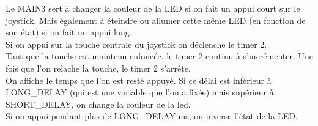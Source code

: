 Le MAIN3 sert à changer la couleur de la LED si on fait un appui court sur le joystick. Mais également à éteindre ou allumer cette même LED (en fonction de son état) si on fait un appui long.\\

Si on appui sur la touche centrale du joystick on déclenche le timer 2.\\
Tant que la touche est maintenu enfoncée, le timer 2 continu à s'incrémenter.
Une fois que l'on relache la touche, le timer 2 s'arrête.\\
On affiche le temps que l'on est resté appuyé.
Si ce délai est inférieur à LONG\_DELAY (qui est une variable que l'on a fixée) mais supérieur à SHORT\_DELAY, on change la couleur de la led.\\
Si on appui pendant plus de LONG\_DELAY ms, on inverse l'état de la LED.

